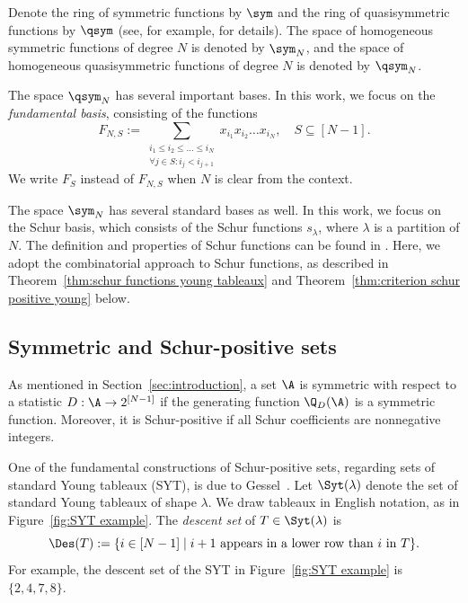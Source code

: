Denote the ring of symmetric functions by $\sym$ and the ring of quasisymmetric functions by $\qsym$ (see, for example, \cite[Section 1]{S3_patterns_list} for details). The space of homogeneous symmetric functions of degree $N$ is denoted by $\sym_N$, and the space of homogeneous quasisymmetric functions of degree $N$ is denoted by $\qsym_N$.

The space $\qsym_N$ has several important bases. In this work, we focus on the \emph{fundamental basis}, consisting of the functions
\[
    F_{N,S} := \sum_{\substack{i_1 \le i_2 \le \dots \le i_N \\ \forall j \in S:i_j < i_{j+1}}} x_{i_1} x_{i_2} \dots x_{i_N},\quad S \subseteq [N - 1].
\]
We write $F_S$ instead of $F_{N,S}$ when $N$ is clear from the context.

The space $\sym_N$ has several standard bases as well. In this work, we focus on the Schur basis, which consists of the Schur functions $s_{\lambda}$, where $\lambda$ is a partition of $N$. 
The definition and properties of Schur functions can be found in \cite[Section 4.4]{sagan_book}. Here, we adopt the combinatorial approach to Schur functions, as described in Theorem~\ref{thm:schur functions young tableaux} and Theorem~\ref{thm:criterion schur positive young} below.

\subsection{Symmetric and Schur-positive sets}
\label{subsec:schur positive sets}
As mentioned in Section~\ref{sec:introduction}, a set $\A$ is symmetric with respect to a statistic $D:\A \to 2^{[N-1]}$ if the generating function $\Q_{D}(\A)$ is a symmetric function. Moreover, it is Schur-positive if all Schur coefficients are nonnegative integers.


One of the fundamental constructions of Schur-positive sets, regarding sets of standard Young tableaux (SYT), is due to Gessel~\cite{knuth_classes_schur_positive}. Let $\Syt(\lambda)$ denote the set of standard Young tableaux of shape $\lambda$. We draw tableaux in English notation, as in Figure~\ref{fig:SYT example}. The \emph{descent set} of $T\in \Syt(\lambda)$ is
\[
    \Des(T) := \{i \in [N-1] \mid i+1 \text{ appears in a lower row than $i$ in $T$}\}.
\]
For example, the descent set of the SYT in Figure~\ref{fig:SYT example} is $\{2,4,7,8\}$.

